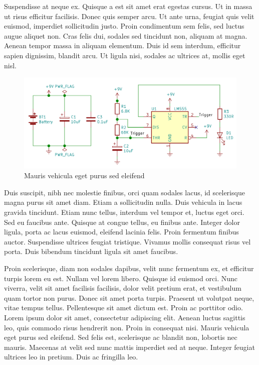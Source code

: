 Suspendisse at neque ex. Quisque a est sit amet erat egestas cursus. Ut in massa ut risus efficitur facilisis. Donec quis semper arcu. Ut ante urna, feugiat quis velit euismod, imperdiet sollicitudin justo. Proin condimentum sem felis, sed luctus augue aliquet non. Cras felis dui, sodales sed tincidunt non, aliquam at magna. Aenean tempor massa in aliquam elementum. Duis id sem interdum, efficitur sapien dignissim, blandit arcu. Ut ligula nisi, sodales ac ultrices at, mollis eget nisl.

\begin{figure}[h]
    \centering
    \includegraphics[width=\textwidth]{figures/chapterC/LM555.png}
    \caption{Mauris vehicula eget purus sed eleifend}
    \label{C_lm555}
\end{figure}

Duis suscipit, nibh nec molestie finibus, orci quam sodales lacus, id scelerisque magna purus sit amet diam. Etiam a sollicitudin nulla. Duis vehicula in lacus gravida tincidunt. Etiam nunc tellus, interdum vel tempor et, luctus eget orci. Sed eu faucibus ante. Quisque at congue tellus, eu finibus ante. Integer dolor ligula, porta ac lacus euismod, eleifend lacinia felis. Proin fermentum finibus auctor. Suspendisse ultrices feugiat tristique. Vivamus mollis consequat risus vel porta. Duis bibendum tincidunt ligula sit amet faucibus.

Proin scelerisque, diam non sodales dapibus, velit nunc fermentum ex, et efficitur turpis lorem eu est. Nullam vel lorem libero. Quisque id euismod orci. Nunc viverra, velit sit amet facilisis facilisis, dolor velit pretium erat, et vestibulum quam tortor non purus. Donec sit amet porta turpis. Praesent ut volutpat neque, vitae tempus tellus. Pellentesque sit amet dictum est. Proin ac porttitor odio. Lorem ipsum dolor sit amet, consectetur adipiscing elit. Aenean luctus sagittis leo, quis commodo risus hendrerit non. Proin in consequat nisi. Mauris vehicula eget purus sed eleifend. Sed felis est, scelerisque ac blandit non, lobortis nec mauris. Maecenas at velit sed nunc mattis imperdiet sed at neque. Integer feugiat ultrices leo in pretium. Duis ac fringilla leo.

